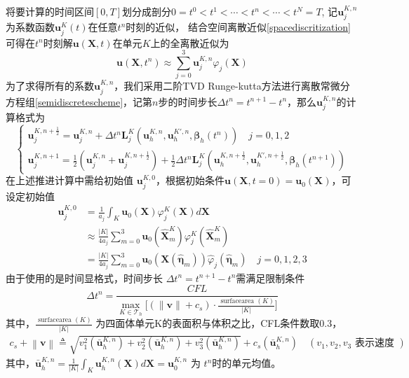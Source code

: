 \documentclass[a4paper, 12pt, UTF8]{ctexart}
\newcommand{\bs}[1]{\boldsymbol{#1}}
\begin{document}
将要计算的时间区间$[0, T]$划分成剖分$0=t^0<t^1<\cdots<t^n<\cdots<t^N=T$, 记$\bs u_j^{K, n}$为系数函数$\bs u_j^K(t)$在任意$t^n$时刻的近似， 结合空间离散近似\eqref{spacediscritization}可得在$t^n$时刻解$\bs u(\bs{X}, t)$在单元$K$上的全离散近似为
\begin{equation}
\bs u(\bs{X}, t^n)\approx \sum\limits_{j=0}^3\bs u_j^{K, n}\varphi_j(\bs{X})
\end{equation}
为了求得所有的系数$\bs u_j^{K, n}$，我们采用二阶TVD Runge-kutta方法进行离散常微分方程组\eqref{semidiscretescheme}，记第$n$步的时间步长$\Delta t^n=t^{n+1}-t^n$，那么$\bs u_j^{K, n}$的计算格式为
\begin{equation}
\begin{cases}
\displaystyle	   \bs u_{j}^{K,n+\frac{1}{2}}=\bs u_{j}^{K,n}+\Delta t^{n}\bs L_{j}^K\left(\bs u_{h}^{K, n}, \bs u_{h}^{K', n},\bs \beta_{h}\left(t^{n}\right)\right) \quad j=0,1,2 \\
\displaystyle	   \bs u_{j}^{K,n+1}=\frac{1}{2}\left(\bs u_{j}^{K, n}+\bs u_{j}^{K,n+\frac{1}{2}}\right)+\frac{1}{2} \Delta t^{n}\bs L_{j}^K\left(\bs u_{h}^{K, n+\frac{1}{2}}, \bs u_{h}^{K', n+\frac{1}{2}},\bs \beta_{h}\left(t^{n+1}\right)\right)
\end{cases}
\end{equation}
在上述推进计算中需给初始值 $\bs u_{j}^{K,0}$，根据初始条件$\bs{u}(\bs{X}, t=0)= \bs u_{0}(\bs{X})$，可设定初始值
\begin{equation}
\begin{aligned}
\bs{u}_{j}^{K, 0} & =\frac{1}{a_{j}} \int_{K} \bs{u}_{0}(\bs{X}) \varphi_{j}^{K}(\bs{X}) d \bs{X} \\
& \approx \frac{|K|}{4 a_{j}} \sum_{m=0}^{3} \bs{u}_{0}\left(\hat{\bs{X}}_{m}^{K}\right) \varphi_{j}^{K}\left(\hat{\bs{X}}_{m}^{K}\right) \\
& =\frac{|K|}{4 a_{j}} \sum_{m=0}^{3} \bs{u}_{0}\left(\bs{X}(\hat{\bs{\eta}}_{m})\right) \hat{\varphi}_{j}\left(\hat{\bs{\eta}}_{m}\right) \quad j=0,1,2,3
\end{aligned} 
\end{equation}
由于使用的是时间显格式，时间步长 $\Delta t^{n}=t^{n+1}-t^{n}$需满足限制条件
\begin{equation}
\displaystyle \Delta t^{n}=\frac{C F L}{\max\limits_{K \in \mathcal T_{h}}\Big[(\|\bs v\|+c_{s}) \cdot \frac{\text { surfacearea }(K)}{|K|}\Big]}
\end{equation}
其中，$ \displaystyle \frac{\text { surfacearea }(K)}{|K|}$ 为四面体单元K的表面积与体积之比，CFL条件数取0.3，
\begin{equation}
	\begin{split}
		\displaystyle c_{s}+\left\|\bs v\right\| \triangleq \sqrt{v_{1}^{2}\left(\bar{\bs u}_h^{K,n}\right)+v_{2}^{2}\left(\bar{\bs u}_h^{K,n}\right)+v_{3}^{2}\left(\bar{\bs u}_h^{K,n}\right)}+c_{s}\left(\bar{\bs u}_h^{K,n}\right) \quad \left(v_{1}, v_{2}, v_{3}\text { 表示速度 }\right)
	\end{split}
\end{equation}
其中，$\bar{\bs{u}}_{h}^{K, n}=\frac{1}{|K|} \int_{K} \bs{u}_{h}^{K, n}(\bs{X}) d \bs{X}=\bs{u}_{0}^{K, n}$ 为 $t^{n}$时的单元均值。
\end{document}
